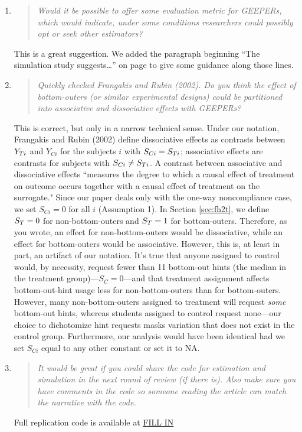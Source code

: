 \documentclass[]{article}
\newenvironment{itquote}
  {\begin{quote} \itshape}
  {\end{quote}\ignorespacesafterend}
\begin{document}
\begin{enumerate}
\item \begin{itquote}    Would it be possible to offer some evaluation metric for GEEPERs, which would indicate, under some conditions researchers could possibly opt or seek other estimators?
\end{itquote}
This is a great suggestion. We added the paragraph beginning ``The simulation study suggests\dots'' on page \pageref{evalMetric} to give some guidance along those lines. 
\item \begin{itquote}     Quickly checked Frangakis and Rubin (2002). Do you think the effect of bottom-outers (or similar experimental designs) could be partitioned into associative and dissociative effects with GEEPERs?
\end{itquote}
This is correct, but only in a narrow technical sense. 
Under our notation, Frangakis and Rubin (2002) define dissociative effects as contrasts between $Y_{Ti}$ and $Y_{Ci}$ for the subjects $i$ with $S_{Ci}=S_{Ti}$; associative effects are contrasts for subjects with $S_{Ci}\ne S_{Ti}$. A contrast between associative and dissociative effects ``measures the degree to which a causal effect of treatment on outcome occurs together with a causal effect of treatment on the surrogate."  Since our paper deals only with the one-way noncompliance case, we set $S_{Ci}=0$ for all $i$ (Assumption 1). In Section \ref{sec:fh2t}, we define $S_T=0$ for non-bottom-outers and $S_T=1$ for bottom-outers. Therefore, as you wrote, an effect for non-bottom-outers would be dissociative, while an effect for bottom-outers would be associative. However, this is, at least in part, an artifact of our notation. It's true that anyone assigned to control would, by necessity, request fewer than 11 bottom-out hints (the median in the treatment group)---$S_C=0$---and that treatment assignment affects bottom-out-hint usage less for non-bottom-outers than for bottom-outers. However, many non-bottom-outers assigned to treatment will request \emph{some} bottom-out hints, whereas students assigned to control request none---our choice to dichotomize hint requests masks variation that does not exist in the control group. Furthermore, our analysis would have been identical had we set $S_{Ci}$ equal to any other constant or set it to NA. 

\item \begin{itquote}    It would be great if you could share the code for estimation and simulation in the next round of review (if there is). Also make sure you have comments in the code so someone reading the article can match the narrative with the code.
\end{itquote}
Full replication code is available at \url{FILL IN} 
\end{enumerate}
\end{document}
